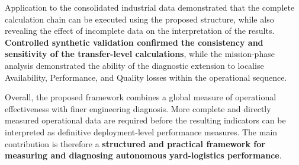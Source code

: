 Application to the consolidated industrial data demonstrated that the complete calculation chain can be executed using the proposed structure, while also revealing the effect of incomplete data on the interpretation of the results. \textbf{Controlled synthetic validation confirmed the consistency and sensitivity of the transfer-level calculations}, while the mission-phase analysis demonstrated the ability of the diagnostic extension to localise Availability, Performance, and Quality losses within the operational sequence.

Overall, the proposed framework combines a global measure of operational effectiveness with finer engineering diagnosis. More complete and directly measured operational data are required before the resulting indicators can be interpreted as definitive deployment-level performance measures. The main contribution is therefore a \textbf{structured and practical framework for measuring and diagnosing autonomous yard-logistics performance}.
\setlength{\textfloatsep}{\chapterThreeTextFloatSep}
\setlength{\floatsep}{\chapterThreeFloatSep}
\setlength{\intextsep}{\chapterThreeInTextSep}
\setlength{\abovecaptionskip}{\chapterThreeAboveCaptionSkip}
\setlength{\belowcaptionskip}{\chapterThreeBelowCaptionSkip}